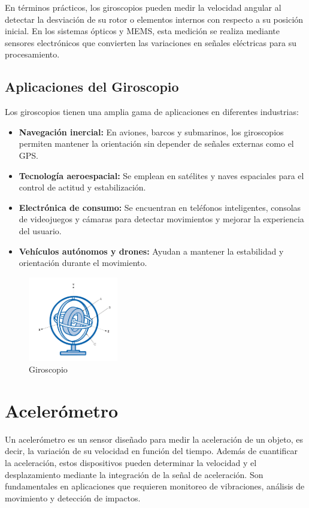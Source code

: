 \documentclass{article}
\begin{document}
	En términos prácticos, los giroscopios pueden medir la velocidad angular al detectar la desviación de su rotor o elementos internos con respecto a su posición inicial. En los sistemas ópticos y MEMS, esta medición se realiza mediante sensores electrónicos que convierten las variaciones en señales eléctricas para su procesamiento.
	
	\subsection{Aplicaciones del Giroscopio}
	Los giroscopios tienen una amplia gama de aplicaciones en diferentes industrias:
	
	\begin{itemize}
		\item \textbf{Navegación inercial:} En aviones, barcos y submarinos, los giroscopios permiten mantener la orientación sin depender de señales externas como el GPS.
		\item \textbf{Tecnología aeroespacial:} Se emplean en satélites y naves espaciales para el control de actitud y estabilización.
		\item \textbf{Electrónica de consumo:} Se encuentran en teléfonos inteligentes, consolas de videojuegos y cámaras para detectar movimientos y mejorar la experiencia del usuario.
		\item \textbf{Vehículos autónomos y drones:} Ayudan a mantener la estabilidad y orientación durante el movimiento.
	\end{itemize}
	\begin{figure}[H]
		\centering
		\includegraphics[width=0.35\textwidth]{giroscopio.png}
		\caption{Giroscopio}
	\end{figure}
	
	
	\section{Acelerómetro} Un acelerómetro es un sensor diseñado para medir la aceleración de un objeto, es decir, la variación de su velocidad en función del tiempo. Además de cuantificar la aceleración, estos dispositivos pueden determinar la velocidad y el desplazamiento mediante la integración de la señal de aceleración. Son fundamentales en aplicaciones que requieren monitoreo de vibraciones, análisis de movimiento y detección de impactos.
\end{document}
